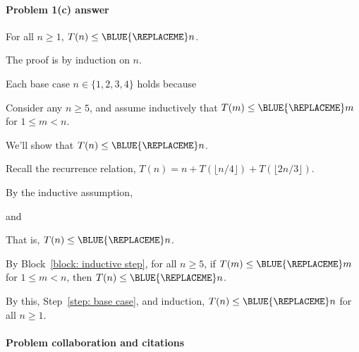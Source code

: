 \paragraph{Problem 1(c) answer}

\begin{lemma}
  For all $n\ge 1$,  $T(n) \le \BLUE{
    \REPLACEME
  } n$.
\end{lemma}

\begin{longFormProof}

  \step The proof is by induction on $n$.

  \step\label{step: base case}

  Each base case $n\in\{1,2,3,4\}$ holds because
  \BLUE{
    \REPLACEME
  }
  \begin{block}\label{block: inductive step}
    
    \step Consider any $n\ge 5$, and assume inductively that $T(m)\le \BLUE{
      \REPLACEME
    } m$ for $1\le m < n$.

    \step We'll show that $T(n) \le \BLUE{ \REPLACEME } n$.

    \step Recall the recurrence relation, $T(n) = n + T(\lfloor n/4\rfloor) + T(\lfloor 2n/3 \rfloor)$.

    \step By the inductive assumption, \BLUE{
      \REPLACEME
    }
    
    \step and
    \BLUE{
      \REPLACEME
    }

    \BLUE{
      \step   \REPLACEME
    }

    \step That is, $T(n)\le \BLUE{
      \REPLACEME
    } n$.
  \end{block}

  \step By Block~\ref{block: inductive step},
  for all $n\ge 5$, if $T(m)\le \BLUE{
    \REPLACEME
  } m$ for $1\le m < n$,  then $T(n)\le \BLUE{
    \REPLACEME
  } n$.

  \step By this, Step~\ref{step: base case}, and induction, $T(n)\le \BLUE{
    \REPLACEME
  } n$ for all $n\ge 1$.
\end{longFormProof}

\newpage

\paragraph{Problem  collaboration and citations}

